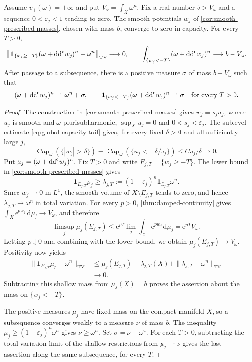 \begin{corollary}\label{cor:smooth-capacity-mass-defect}
Assume $v_+(\omega)=+\infty$ and put $V_\omega=\int_X\omega^n$. Fix a real number $b>V_\omega$ and a sequence $0<\varepsilon_j<1$ tending to zero. The smooth potentials $w_j$ of \cref{cor:smooth-prescribed-masses}, chosen with mass $b$, converge to zero in capacity. For every $T>0$,
\[
 \left\|\mathbf1_{\{w_j\geq-T\}}(\omega+\mathrm{dd}^{\mathrm{c}} w_j)^n-\omega^n
 \right\|_{\mathrm{TV}}\longrightarrow0,
 \qquad
 \int_{\{w_j<-T\}}(\omega+\mathrm{dd}^{\mathrm{c}} w_j)^n\longrightarrow b-V_\omega.
\]
After passage to a subsequence, there is a positive measure $\sigma$ of mass $b-V_\omega$ such that
\[
 (\omega+\mathrm{dd}^{\mathrm{c}} w_j)^n\rightharpoonup\omega^n+\sigma,
 \qquad
 \mathbf1_{\{w_j<-T\}}(\omega+\mathrm{dd}^{\mathrm{c}} w_j)^n\rightharpoonup\sigma
 \quad\text{for every }T>0.
\]
\end{corollary}
\begin{proof}
The construction in \cref{cor:smooth-prescribed-masses} gives $w_j=s_j u_j$, where $u_j$ is smooth and $\omega$-plurisubharmonic, $\sup_Xu_j=0$ and $0<s_j<\varepsilon_j$. The sublevel estimate \eqref{eq:global-capacity-tail} gives, for every fixed $\delta>0$ and all sufficiently large $j$,
\[
 \operatorname{Cap}_\omega(\{|w_j|>\delta\})
 =\operatorname{Cap}_\omega(\{u_j<-\delta/s_j\})
 \leq Cs_j/\delta\longrightarrow0.
\]
Put $\mu_j=(\omega+\mathrm{dd}^{\mathrm{c}} w_j)^n$. Fix $T>0$ and write $E_{j,T}=\{w_j\geq-T\}$. The lower bound in \cref{cor:smooth-prescribed-masses} gives
\[
 \mathbf1_{E_{j,T}}\mu_j\geq
 \lambda_{j,T}:=(1-\varepsilon_j)^n\mathbf1_{E_{j,T}}\omega^n.
\]
Since $w_j\to0$ in $L^1$, the smooth volume of $X\setminus E_{j,T}$ tends to zero, and hence $\lambda_{j,T}\to\omega^n$ in total variation. For every $p>0$, \cref{thm:damped-continuity} gives $\int_X\mathrm{e}^{pw_j}\,\mathrm{d}\mu_j\to V_\omega$, and therefore
\[
 \limsup_j\mu_j(E_{j,T})
 \leq\mathrm{e}^{pT}\lim_j\int_X\mathrm{e}^{pw_j}\,\mathrm{d}\mu_j
 =\mathrm{e}^{pT}V_\omega.
\]
Letting $p\downarrow0$ and combining with the lower bound, we obtain $\mu_j(E_{j,T})\to V_\omega$. Positivity now yields
\[
 \begin{split}
 \|\mathbf1_{E_{j,T}}\mu_j-\omega^n\|_{\mathrm{TV}}
 &\leq\mu_j(E_{j,T})-\lambda_{j,T}(X)
       +\|\lambda_{j,T}-\omega^n\|_{\mathrm{TV}}\\
 &\longrightarrow0.
 \end{split}
\]
Subtracting this shallow mass from $\mu_j(X)=b$ proves the assertion about the mass on $\{w_j<-T\}$.

The positive measures $\mu_j$ have fixed mass on the compact manifold $X$, so a subsequence converges weakly to a measure $\nu$ of mass $b$. The inequality $\mu_j\geq(1-\varepsilon_j)^n\omega^n$ gives $\nu\geq\omega^n$. Set $\sigma=\nu-\omega^n$. For each $T>0$, subtracting the total-variation limit of the shallow restrictions from $\mu_j\rightharpoonup\nu$ gives the last assertion along the same subsequence, for every $T$.
\end{proof}

